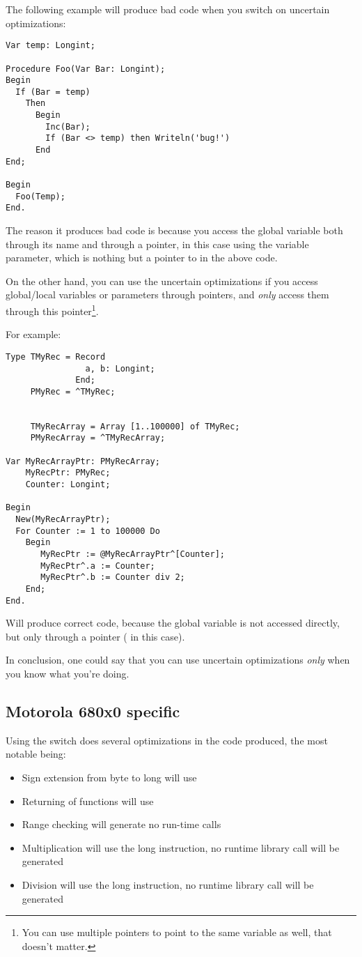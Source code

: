 \documentclass{report}
\begin{document}
\begin{enumerate}
The following example will produce bad code when you switch on
uncertain optimizations:
\begin{verbatim}
Var temp: Longint;

Procedure Foo(Var Bar: Longint);
Begin
  If (Bar = temp)
    Then
      Begin
        Inc(Bar);
        If (Bar <> temp) then Writeln('bug!')
      End
End;

Begin
  Foo(Temp);
End.
\end{verbatim}
The reason it produces bad code is because you access the global variable
 both through its name  and through a pointer, in this
case using the  variable parameter, which is nothing but a pointer
to  in the above code.

On the other hand, you can use the uncertain optimizations if
you access global/local variables or parameters through pointers,
and {\em only} access them through this pointer\footnote{
You can use multiple pointers to point to the same variable as well, that
doesn't matter.}.

For example:
\begin{verbatim}
Type TMyRec = Record
                a, b: Longint;
              End;
     PMyRec = ^TMyRec;


     TMyRecArray = Array [1..100000] of TMyRec;
     PMyRecArray = ^TMyRecArray;

Var MyRecArrayPtr: PMyRecArray;
    MyRecPtr: PMyRec;
    Counter: Longint;

Begin
  New(MyRecArrayPtr);
  For Counter := 1 to 100000 Do
    Begin
       MyRecPtr := @MyRecArrayPtr^[Counter];
       MyRecPtr^.a := Counter;
       MyRecPtr^.b := Counter div 2;
    End;
End.
\end{verbatim}
Will produce correct code, because the global variable 
is not accessed directly, but only through a pointer ( in this
case).

In conclusion, one could say that you can use uncertain optimizations {\em
only} when you know what you're doing.
\end{enumerate}

\subsection{ Motorola 680x0 specific }

Using the  switch does several optimizations in the
code produced, the most notable being:

\begin{itemize}
\item Sign extension from byte to long will use 
\item Returning of functions will use 
\item Range checking will generate no run-time calls
\item Multiplication will use the long  instruction, no
runtime library call will be generated
\item Division will use the long  instruction, no
runtime library call will be generated
\end{itemize}
\end{document}
